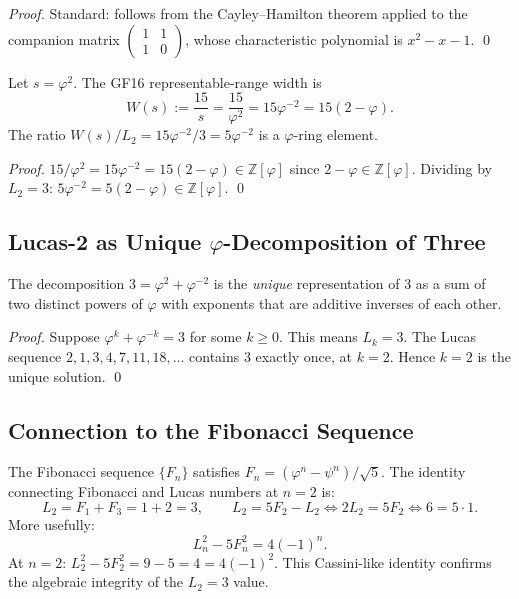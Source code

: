 \begin{proof}
Standard: follows from the Cayley--Hamilton theorem applied
to the companion matrix $\begin{pmatrix} 1 & 1 \\ 1 & 0
\end{pmatrix}$, whose characteristic polynomial is
$x^2 - x - 1$.
\qed
\end{proof}

\begin{lemma}\label{lem:gf16-width}
Let $s = \varphi^2$.  The GF16 representable-range width is
\[
  W(s) := \frac{15}{s} = \frac{15}{\varphi^2}
         = 15\varphi^{-2} = 15(2 - \varphi).
\]
The ratio $W(s) / L_2 = 15\varphi^{-2} / 3 = 5\varphi^{-2}$
is a $\varphi$-ring element.
\end{lemma}

\begin{proof}
$15 / \varphi^2 = 15\varphi^{-2} = 15(2-\varphi) \in
\mathbb{Z}[\varphi]$ since $2-\varphi \in \mathbb{Z}[\varphi]$.
Dividing by $L_2 = 3$: $5\varphi^{-2} = 5(2-\varphi)
\in \mathbb{Z}[\varphi]$.
\qed
\end{proof}

\subsection{Lucas-2 as Unique $\varphi$-Decomposition of Three}

\begin{proposition}\label{prop:unique-decomp}
The decomposition $3 = \varphi^2 + \varphi^{-2}$ is the
\emph{unique} representation of $3$ as a sum of two distinct
powers of $\varphi$ with exponents that are additive inverses
of each other.
\end{proposition}

\begin{proof}
Suppose $\varphi^k + \varphi^{-k} = 3$ for some $k \geq 0$.
This means $L_k = 3$.  The Lucas sequence
$2, 1, 3, 4, 7, 11, 18, \ldots$ contains $3$ exactly once,
at $k = 2$.  Hence $k = 2$ is the unique solution.
\qed
\end{proof}

\subsection{Connection to the Fibonacci Sequence}

The Fibonacci sequence $\{F_n\}$ satisfies
$F_n = (\varphi^n - \psi^n)/\sqrt{5}$.  The identity
connecting Fibonacci and Lucas numbers at $n = 2$ is:
\[
  L_2 = F_1 + F_3 = 1 + 2 = 3, \qquad
  L_2 = 5F_2 - L_2 \iff 2L_2 = 5F_2 \iff 6 = 5\cdot 1.
\]
More usefully:
\[
  L_n^2 - 5F_n^2 = 4(-1)^n.
\]
At $n = 2$: $L_2^2 - 5F_2^2 = 9 - 5 = 4 = 4(-1)^2$.  This
Cassini-like identity \citep{koshy2001fibonacci} confirms the
algebraic integrity of the $L_2 = 3$ value.

